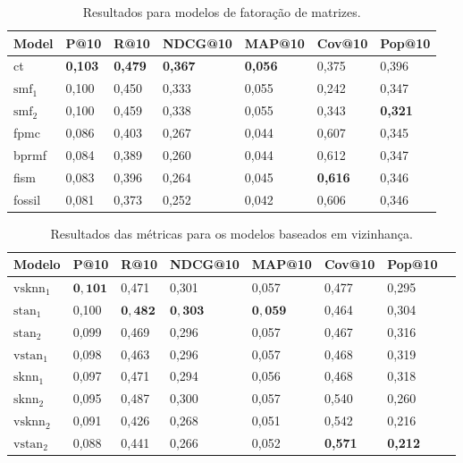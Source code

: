 \begin{table}[htbp]
  \centering
  \begin{tabular}{|l|l|l|l|l|l|l|}
    \hline
    Model & P@10 & R@10 & NDCG@10 & MAP@10 & Cov@10 & Pop@10 \\
    \hline
    ct & \textbf{0,103} & \textbf{0,479} & \textbf{0,367} & \textbf{0,056} & 0,375 & 0,396 \\
    \hline
    $\text{smf}_1$ & 0,100 & 0,450 & 0,333 & 0,055 & 0,242 & 0,347 \\
    \hline
    $\text{smf}_2$ & 0,100 & 0,459 & 0,338 & 0,055 & 0,343 &\textbf{ 0,321} \\
    \hline
    fpmc & 0,086 & 0,403 & 0,267 & 0,044 & 0,607 & 0,345 \\
    \hline
    bprmf & 0,084 & 0,389 & 0,260 & 0,044 & 0,612 & 0,347 \\
    \hline
    fism & 0,083 & 0,396 & 0,264 & 0,045 & \textbf{0,616} & 0,346 \\
    \hline
    fossil & 0,081 & 0,373 & 0,252 & 0,042 & 0,606 & 0,346 \\
    \hline
  \end{tabular}
  \caption{Resultados para modelos de fatoração de matrizes.}

\end{table}
\begin{table}[htbp]
  \centering
  \begin{tabular}{|l|l|l|l|l|l|l|l|}
    \hline
    Modelo & P@10 & R@10 & NDCG@10 & MAP@10 & Cov@10 & Pop@10 \\
    \hline
    $\text{vsknn}_1$ & $\mathbf{0,101}$ & 0,471 & 0,301 & 0,057 & 0,477 & 0,295 \\
    \hline
    $\text{stan}_1$ & 0,100 & $\mathbf{0,482}$ & $\mathbf{0,303}$ & $\mathbf{0,059}$ & 0,464 & 0,304 \\
    \hline
    $\text{stan}_2$ & 0,099 & 0,469 & 0,296 & 0,057 & 0,467 & 0,316 \\
    \hline
    $\text{vstan}_1$ & 0,098 & 0,463 & 0,296 & 0,057 & 0,468 & 0,319 \\
    \hline
    $\text{sknn}_1$ & 0,097 & 0,471 & 0,294 & 0,056 & 0,468 & 0,318 \\
    \hline
    $\text{sknn}_2$ & 0,095 & 0,487 & 0,300 & 0,057 & 0,540 & 0,260 \\
    \hline
    $\text{vsknn}_2$ & 0,091 & 0,426 & 0,268 & 0,051 & 0,542 & 0,216 \\
    \hline
    $\text{vstan}_2$ & 0,088 & 0,441 & 0,266 & 0,052 & \textbf{0,571} & \textbf{0,212} \\
    \hline
  \end{tabular}
  \caption{Resultados das métricas para os modelos baseados em vizinhança.}
  \label{tab_model_metrics}
\end{table}

